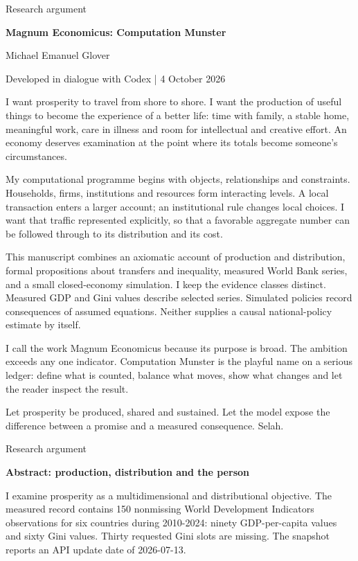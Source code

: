 \documentclass[10pt]{article}
\begin{document}
{\small\color{accent}Research argument}\par
{\LARGE\bfseries\color{ink}Magnum Economicus: Computation Munster}\par\vspace{7pt}
Michael Emanuel Glover\par Developed in dialogue with Codex | 4 October 2026\par\vspace{8pt}
I want prosperity to travel from shore to shore. I want the production of useful things to become the experience of a better life: time with family, a stable home, meaningful work, care in illness and room for intellectual and creative effort. An economy deserves examination at the point where its totals become someone's circumstances.\par
My computational programme begins with objects, relationships and constraints. Households, firms, institutions and resources form interacting levels. A local transaction enters a larger account; an institutional rule changes local choices. I want that traffic represented explicitly, so that a favorable aggregate number can be followed through to its distribution and its cost.\par
This manuscript combines an axiomatic account of production and distribution, formal propositions about transfers and inequality, measured World Bank series, and a small closed-economy simulation. I keep the evidence classes distinct. Measured GDP and Gini values describe selected series. Simulated policies record consequences of assumed equations. Neither supplies a causal national-policy estimate by itself.\par
I call the work Magnum Economicus because its purpose is broad. The ambition exceeds any one indicator. Computation Munster is the playful name on a serious ledger: define what is counted, balance what moves, show what changes and let the reader inspect the result.\par
Let prosperity be produced, shared and sustained. Let the model expose the difference between a promise and a measured consequence. Selah.\par
\clearpage
{\small\color{accent}Research argument}\par
{\LARGE\bfseries\color{ink}Abstract: production, distribution and the person}\par\vspace{7pt}
I examine prosperity as a multidimensional and distributional objective. The measured record contains 150 nonmissing World Development Indicators observations for six countries during 2010-2024: ninety GDP-per-capita values and sixty Gini values. Thirty requested Gini slots are missing. The snapshot reports an API update date of 2026-07-13.\par
\end{document}
